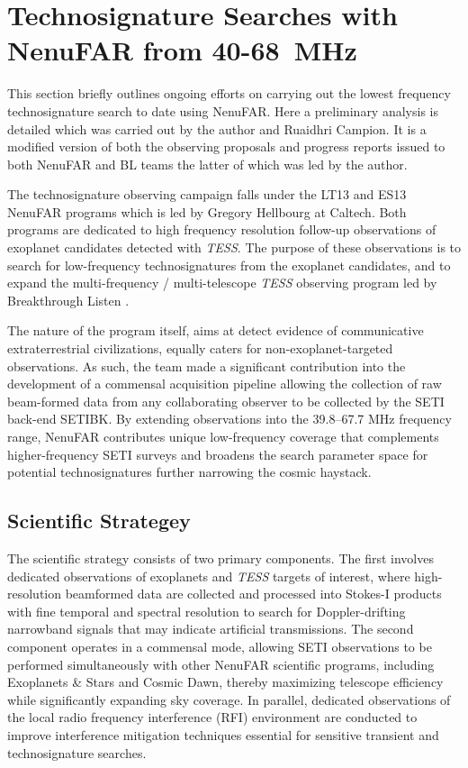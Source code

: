 \newpage
\section{Technosignature Searches with NenuFAR from 40-68~MHz}

This section briefly outlines ongoing efforts on carrying out the lowest frequency technosignature search to date using NenuFAR. Here a preliminary analysis is detailed which was carried out by the author and Ruaidhri Campion. It is a modified version of both the observing proposals and progress reports issued to both NenuFAR and BL teams the latter of which was led by the author. 

The technosignature observing campaign falls under the LT13 and ES13 NenuFAR programs which is led by Gregory Hellbourg at Caltech. Both programs are dedicated to high frequency resolution follow-up observations of exoplanet candidates detected with \textit{TESS}. The purpose of these observations is to search for low-frequency technosignatures from the exoplanet candidates, and to expand the multi-frequency / multi-telescope \textit{TESS} observing program led by Breakthrough Listen \citep{gsc+19}.

The nature of the program itself, aims at detect evidence of communicative extraterrestrial
civilizations, equally caters for non-exoplanet-targeted observations. As such, the team made a significant contribution into the development of a commensal acquisition pipeline allowing the collection of raw beam-formed data from any collaborating observer to be collected by the SETI back-end SETIBK. By extending observations into the 39.8–67.7 MHz frequency range, NenuFAR contributes unique low-frequency coverage that complements higher-frequency SETI surveys and broadens the search parameter space for potential technosignatures further narrowing the cosmic haystack. 

\subsection{Scientific Strategey}

The scientific strategy consists of two primary components. The first involves dedicated observations of exoplanets and \textit{TESS} targets of interest, where high-resolution beamformed data are collected and processed into Stokes-I products with fine temporal and spectral resolution to search for Doppler-drifting narrowband signals that may indicate artificial transmissions. The second component operates in a commensal mode, allowing SETI observations to be performed simultaneously with other NenuFAR scientific programs, including Exoplanets \& Stars and Cosmic Dawn, thereby maximizing telescope efficiency while significantly expanding sky coverage. In parallel, dedicated observations of the local radio frequency interference (RFI) environment are conducted to improve interference mitigation techniques essential for sensitive transient and technosignature searches.

